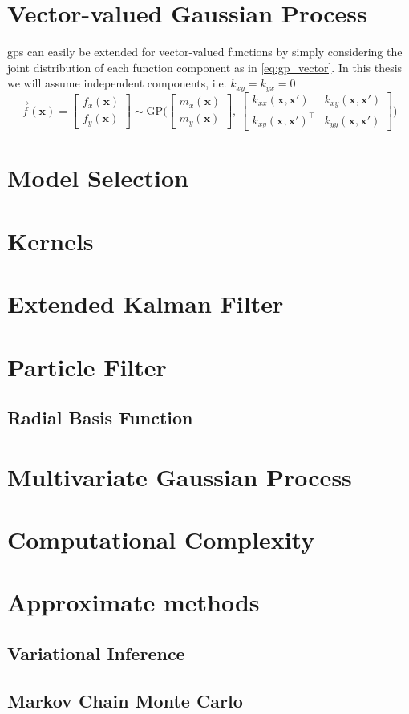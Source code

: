 \section{Vector-valued Gaussian Process}
\acrshort{gp}s can easily be extended for vector-valued functions by simply considering the joint distribution of each function component as in \cref{eq:gp_vector}. In this thesis we will assume independent components, i.e. $k_{xy}=k_{yx}=0$
\begin{equation}\label{eq:gp_vector}
     \vec{f}(\boldsymbol{x}) = \begin{bmatrix} f_x (\boldsymbol{x})\\ f_y (\boldsymbol{x})\end{bmatrix} \sim \text{GP} \big(\begin{bmatrix} m_x(\boldsymbol{x})\\m_y(\boldsymbol{x})\end{bmatrix}, \ \begin{bmatrix}
    k_{xx}(\boldsymbol{x}, \boldsymbol{x}') & k_{xy}(\boldsymbol{x}, \boldsymbol{x}') \\ k_{xy}(\boldsymbol{x}, \boldsymbol{x}')^\intercal & k_{yy}(\boldsymbol{x}, \boldsymbol{x}')
    \end{bmatrix}\big) 
\end{equation}

\section{Model Selection}
\section{Kernels}\label{sec:kernels}

\section{Extended Kalman Filter}
\section{Particle Filter}
\subsection{Radial Basis Function}\label{sec:kernels_rbf}
\section{Multivariate Gaussian Process}
\section{Computational Complexity}
\section{Approximate methods}
\subsection{Variational Inference}
\subsection{Markov Chain Monte Carlo}
